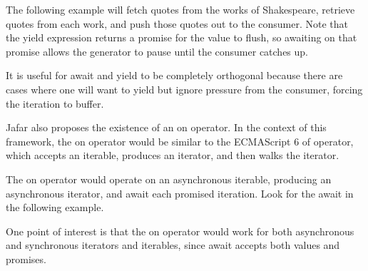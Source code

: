 The following example will fetch quotes from the works of Shakespeare, retrieve quotes from each work, and push those quotes out to the consumer. Note that the yield expression returns a promise for the value to flush, so awaiting on that promise allows the generator to pause until the consumer catches up.


It is useful for await and yield to be completely orthogonal because there are cases where one will want to yield but ignore pressure from the consumer, forcing the iteration to buffer.

Jafar also proposes the existence of an on operator. In the context of this framework, the on operator would be similar to the ECMAScript 6 of operator, which accepts an iterable, produces an iterator, and then walks the iterator.



The on operator would operate on an asynchronous iterable, producing an asynchronous iterator, and await each promised iteration. Look for the await in the following example.


%
One point of interest is that the on operator would work for both asynchronous and synchronous iterators and iterables, since await accepts both values and promises.

